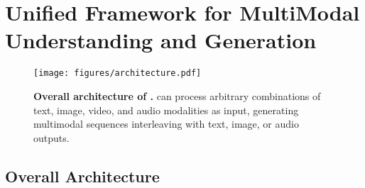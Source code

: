 \section{Unified Framework for MultiModal Understanding and Generation}\label{sec:overall_architecture}



\begin{figure}[t]
    \centering
    \texttt{[image: figures/architecture.pdf]}
    \caption{
    \textbf{Overall architecture of \method.} \method can process arbitrary combinations of text, image, video, and audio modalities as input, generating multimodal sequences interleaving with text, image, or audio outputs.
    }
    \label{fig-architecture}
\end{figure}


\subsection{Overall Architecture}\label{subsec:app_architecture}



